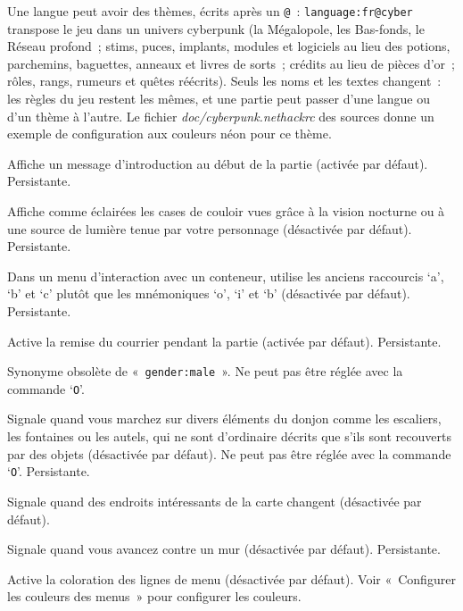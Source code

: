 \documentclass[titlepage]{article}
\begin{document}
\begin{description}
Une langue peut avoir des thèmes, écrits après un \texttt{@}~:
\texttt{language:fr@cyber} transpose le jeu dans un univers cyberpunk
(la Mégalopole, les Bas-fonds, le Réseau profond~; stims, puces,
implants, modules et logiciels au lieu des potions, parchemins,
baguettes, anneaux et livres de sorts~; crédits au lieu de pièces d'or~;
rôles, rangs, rumeurs et quêtes réécrits).
Seuls les noms et les textes changent~: les règles du jeu restent les
mêmes, et une partie peut passer d'une langue ou d'un thème à l'autre.
Le fichier \textit{doc/cyberpunk.nethackrc} des sources donne un exemple de
configuration aux couleurs néon pour ce thème.

\item[{legacy}]
Affiche un message d'introduction au début de la partie (activée par
défaut).
Persistante.

\item[{lit\_corridor}]
Affiche comme éclairées les cases de couloir vues grâce à la vision
nocturne ou à une source de lumière tenue par votre personnage (désactivée
par défaut).
Persistante.

\item[{lootabc}]
Dans un menu d'interaction avec un conteneur, utilise les anciens
raccourcis `a', `b' et `c' plutôt que les mnémoniques
`o', `i' et `b' (désactivée par défaut).
Persistante.

\item[{mail}]
Active la remise du courrier pendant la partie (activée par défaut).
Persistante.

\item[{male}]
Synonyme obsolète de «~\texttt{gender:male}~».
Ne peut pas être réglée avec la commande `\texttt{O}'.

\item[{mention\_decor}]
Signale quand vous marchez sur divers éléments du donjon comme les
escaliers, les fontaines ou les autels, qui ne sont d'ordinaire décrits que
s'ils sont recouverts par des objets (désactivée par défaut).
Ne peut pas être réglée avec la commande `\texttt{O}'.
Persistante.

\item[{mention\_map}]
Signale quand des endroits intéressants de la carte changent (désactivée
par défaut).

\item[{mention\_walls}]
Signale quand vous avancez contre un mur (désactivée par défaut).
Persistante.

\item[{menucolors}]
Active la coloration des lignes de menu (désactivée par défaut).
Voir «~Configurer les couleurs des menus~» pour configurer les
couleurs.


\end{description}
\end{document}
